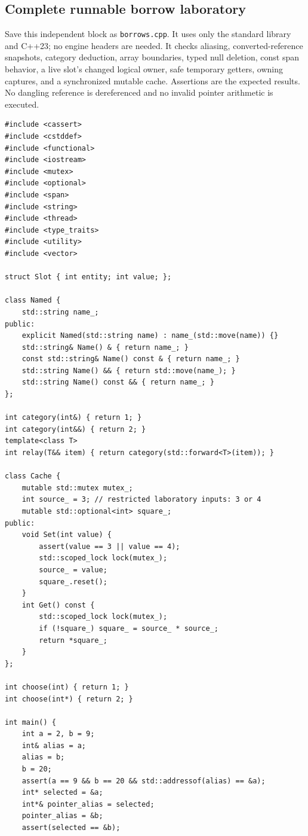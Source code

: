 \subsection{Complete runnable borrow laboratory}\label{05-engine-i-ch004-complete-runnable-borrow-laboratory}

Save this independent block as \texttt{borrows.cpp}. It uses only the standard library and C++23; no engine headers are needed. It checks aliasing, converted-reference snapshots, category deduction, array boundaries, typed null deletion, const span behavior, a live slot's changed logical owner, safe temporary getters, owning captures, and a synchronized mutable cache. Assertions are the expected results. No dangling reference is dereferenced and no invalid pointer arithmetic is executed.

\begin{verbatim}
#include <cassert>
#include <cstddef>
#include <functional>
#include <iostream>
#include <mutex>
#include <optional>
#include <span>
#include <string>
#include <thread>
#include <type_traits>
#include <utility>
#include <vector>

struct Slot { int entity; int value; };

class Named {
    std::string name_;
public:
    explicit Named(std::string name) : name_(std::move(name)) {}
    std::string& Name() & { return name_; }
    const std::string& Name() const & { return name_; }
    std::string Name() && { return std::move(name_); }
    std::string Name() const && { return name_; }
};

int category(int&) { return 1; }
int category(int&&) { return 2; }
template<class T>
int relay(T&& item) { return category(std::forward<T>(item)); }

class Cache {
    mutable std::mutex mutex_;
    int source_ = 3; // restricted laboratory inputs: 3 or 4
    mutable std::optional<int> square_;
public:
    void Set(int value) {
        assert(value == 3 || value == 4);
        std::scoped_lock lock(mutex_);
        source_ = value;
        square_.reset();
    }
    int Get() const {
        std::scoped_lock lock(mutex_);
        if (!square_) square_ = source_ * source_;
        return *square_;
    }
};

int choose(int) { return 1; }
int choose(int*) { return 2; }

int main() {
    int a = 2, b = 9;
    int& alias = a;
    alias = b;
    b = 20;
    assert(a == 9 && b == 20 && std::addressof(alias) == &a);
    int* selected = &a;
    int*& pointer_alias = selected;
    pointer_alias = &b;
    assert(selected == &b);


\end{verbatim}
